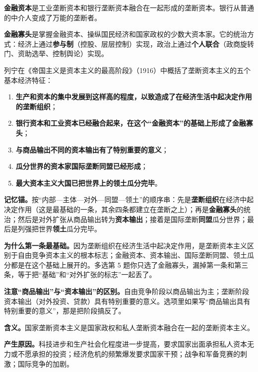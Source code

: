 \documentclass[11pt]{ctexart}
\newcommand{\dw}[1]{\textbf{\color{violetdeep}#1}}   %
\let\origsubhdr\subhdr
\renewcommand{\subhdr}[1]{\par\needspace{4\baselineskip}\origsubhdr{#1}}
\begin{document}

\textbf{金融资本}是工业垄断资本和银行垄断资本融合在一起形成的垄断资本。银行从普通的中介人变成了万能的垄断者。

\textbf{金融寡头}是掌握金融资本、操纵国民经济和国家政权的少数大资本家。它的统治方式：经济上通过\dw{参与制}（控股、层层控制）实现，政治上通过\dw{个人联合}（政商旋转门、资助选举、控制舆论）实现。


列宁在《帝国主义是资本主义的最高阶段》（1916）中概括了垄断资本主义的五个基本经济特征：

\begin{enumerate}[label=（\arabic*）,leftmargin=2.4em]
\item \dw{生产和资本的集中发展到这样高的程度，以致造成了在经济生活中起决定作用的垄断组织}；
\item \dw{银行资本和工业资本已经融合起来，在这个“金融资本”的基础上形成了金融寡头}；
\item \dw{与商品输出不同的资本输出有了特别重要的意义}；
\item \dw{瓜分世界的资本家国际垄断同盟已经形成}；
\item \dw{最大资本主义大国已把世界上的领土瓜分完毕}。
\end{enumerate}

\textbf{记忆锚。}按“内部—主体—对外—同盟—领土”的顺序串：先是\dw{垄断组织}在经济中起决定作用（这是最基础的一条，其余四条都建立在垄断之上）；再是\dw{金融寡头}的统治；然后是对外扩张从商品输出转为\dw{资本输出}；接着是国际垄断\dw{同盟}瓜分世界；最后是列强把世界\dw{领土}瓜分完毕。

\textbf{为什么第一条最基础。}因为垄断组织在经济生活中起决定作用，是垄断资本主义区别于自由竞争资本主义的根本标志；金融资本、资本输出、国际垄断同盟、领土瓜分都是在这个基础上展开的。多选第 5 题你只选了金融寡头，漏掉第一条和第三条，等于把“基础”和“对外扩张的标志”一起丢了。

\textbf{注意“商品输出”与“资本输出”的区别。}自由竞争阶段以商品输出为主；垄断阶段资本输出（对外投资、贷款）具有特别重要的意义。选项里如果写“商品输出具有特别重要的意义”，那是把阶段搞反了。


\textbf{含义。}国家垄断资本主义是国家政权和私人垄断资本融合在一起的垄断资本主义。

\textbf{产生原因。}科技进步和生产社会化程度进一步提高，要求国家出面承担私人资本无力或不愿承担的投资；经济危机的频繁爆发要求国家干预；战争和军备竞赛的刺激；国际竞争的加剧。
\end{document}
